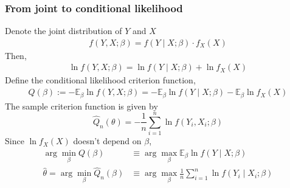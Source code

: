 \documentclass[11pt]{elegantbook}
\begin{document}
\subsubsection*{From joint to conditional likelihood}
Denote the joint distribution of $Y$ and $X$
\begin{equation}
    \begin{aligned}
        f(Y,X;\beta)=f(Y\mid X;\beta)\cdot f_X(X)
    \end{aligned}
    \nonumber
\end{equation}
Then,
\begin{equation}
    \begin{aligned}
        \ln f(Y,X;\beta)=\ln f(Y\mid X;\beta)+\ln f_X(X)
    \end{aligned}
    \nonumber
\end{equation}
Define the conditional likelihood criterion function,
\begin{equation}
    \begin{aligned}
        Q(\beta):=-\mathbb{E}_{\beta}\ln f(Y,X;\beta)=-\mathbb{E}_{\beta}\ln f(Y\mid X;\beta)-\mathbb{E}_{\beta}\ln f_X(X)
    \end{aligned}
    \nonumber
\end{equation}
The sample criterion function is given by $$\hat{Q}_n(\theta)=-\frac{1}{n}\sum_{i=1}^n\ln f(Y_i,X_i;\beta)$$
Since $\ln f_X(X)$ doesn't depend on $\beta$,
\begin{equation}
    \begin{aligned}
        \arg\min_{\beta}Q(\beta)&\equiv \arg\max_{\beta}\mathbb{E}_{\beta}\ln f(Y\mid X;\beta)\\
        \hat{\theta}=\arg\min_{\beta}\hat{Q}_n(\beta)&\equiv \arg\max_{\beta}\frac{1}{n}\sum_{i=1}^n\ln f(Y_i\mid X_i;\beta)
    \end{aligned}
    \nonumber
\end{equation}
\begin{equation}
    \begin{aligned}
    \end{aligned}
    \nonumber
\end{equation}
\end{document}
